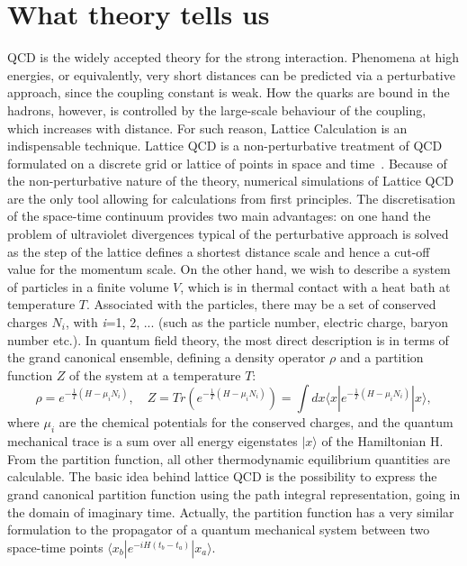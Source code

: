 \section{What theory tells us}
\label{sec:Lattice}
QCD is the widely accepted theory for the strong interaction. 
Phenomena at high energies, or equivalently, very short distances can be
predicted via a perturbative approach, since the coupling constant is weak. 
How the quarks are bound in the hadrons, however, is controlled by 
the large-scale behaviour of the coupling, which increases with distance. 
For such reason, Lattice Calculation is an indispensable technique. 
Lattice QCD is a non-perturbative treatment of QCD formulated 
on a discrete grid or lattice of points in space and time~\cite{Philipsen:2012nu}. 
Because of the non-perturbative nature of the theory, 
numerical simulations of Lattice QCD are the only tool 
allowing for calculations from first principles. The discretisation of the 
space-time continuum provides two main 
advantages: on one hand the problem of ultraviolet divergences typical 
of the perturbative approach is solved 
as the step of the lattice defines a shortest distance scale and hence a 
cut-off value for the momentum scale. 
On the other hand, we wish to describe a system of particles in a finite 
volume $V$, which is in thermal contact 
with a heat bath at temperature $T$. Associated with the particles, there 
may be a set of conserved charges 
$N_i$, with \textit{i}=1, 2, ... (such as the particle number, electric charge, 
baryon number etc.). In quantum field 
theory, the most direct description is in terms of the grand canonical ensemble, 
defining a density operator $\rho$ and a partition function $Z$ of the system at a temperature $T$:
\begin{equation}
\rho =e^{-\frac{1}{T}(H-\mu_iN_i)},\quad Z=Tr(e^{-\frac{1}{T}(H-\mu_iN_i)})=  \int dx \langle x|e^{-\frac{1}{T}(H-\mu_iN_i)}|x\rangle,
\end{equation}
where $\mu_i$ are the chemical potentials for the conserved charges, and 
the quantum mechanical trace is a sum over 
all energy eigenstates $|x\rangle$ of the Hamiltonian H. 
From the partition function, all other thermodynamic equilibrium quantities are 
calculable. The basic idea behind lattice 
QCD is the possibility to express the grand canonical partition function using the 
path integral representation, going in the 
domain of imaginary time. Actually, the partition function has a very similar 
formulation to the propagator of a quantum 
mechanical system between two space-time points $\langle x_b|e^{-iH(t_b-t_a)}|x_a\rangle$. 
